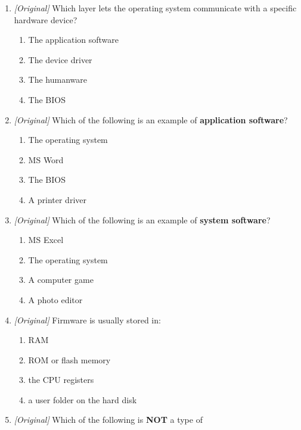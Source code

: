 \documentclass[11pt]{article}
\begin{document}
\begin{enumerate}[label=\textbf{Q\arabic*.}, leftmargin=*]
  \begin{enumerate}[label=\Alph*.]
    \item I only
    \item I and II only
    \item II and III only
    \item I, II, and III
  \end{enumerate}
\item \textit{[Original]} Which layer lets the operating system communicate
  with a specific hardware device?
  \begin{enumerate}[label=\Alph*.]
    \item The application software
    \item The device driver
    \item The humanware
    \item The BIOS
  \end{enumerate}
\item \textit{[Original]} Which of the following is an example of
  \textbf{application software}?
  \begin{enumerate}[label=\Alph*.]
    \item The operating system
    \item MS Word
    \item The BIOS
    \item A printer driver
  \end{enumerate}
\item \textit{[Original]} Which of the following is an example of
  \textbf{system software}?
  \begin{enumerate}[label=\Alph*.]
    \item MS Excel
    \item The operating system
    \item A computer game
    \item A photo editor
  \end{enumerate}
\item \textit{[Original]} Firmware is usually stored in:
  \begin{enumerate}[label=\Alph*.]
    \item RAM
    \item ROM or flash memory
    \item the CPU registers
    \item a user folder on the hard disk
  \end{enumerate}
\item \textit{[Original]} Which of the following is \textbf{NOT} a type of

\end{enumerate}
\end{document}
